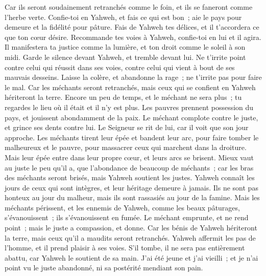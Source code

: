 \begin{multicols}{2}
Car ils seront soudainement retranchés comme le foin, et ils se faneront comme l'herbe verte.
 Confie-toi en Yahweh, et fais ce qui est bon~; aie le pays pour demeure et la fidélité pour pâture.
Fais de Yahweh tes délices, et il t'accordera ce que ton cœur désire.
 Recommande tes voies à Yahweh, confie-toi en lui et il agira.
Il manifestera ta justice comme la lumière, et ton droit comme le soleil à son midi.
 Garde le silence devant Yahweh, et tremble devant lui. Ne t'irrite point contre celui qui réussit dans ses voies, contre celui qui vient à bout de ses mauvais desseins.
 Laisse la colère, et abandonne la rage~; ne t'irrite pas pour faire le mal.
Car les méchants seront retranchés, mais ceux qui se confient en Yahweh hériteront la terre.
 Encore un peu de temps, et le méchant ne sera plus~; tu regardes le lieu où il était et il n'y est plus.
Les pauvres prennent possession du pays, et jouissent abondamment de la paix.
 Le méchant complote contre le juste, et grince ses dents contre lui.
Le Seigneur se rit de lui, car il voit que son jour approche.
 Les méchants tirent leur épée et bandent leur arc, pour faire tomber le malheureux et le pauvre, pour massacrer ceux qui marchent dans la droiture.
Mais leur épée entre dans leur propre cœur, et leurs arcs se brisent.
 Mieux vaut au juste le peu qu'il a, que l'abondance de beaucoup de méchants~;
car les bras des méchants seront brisés, mais Yahweh soutient les justes.
 Yahweh connaît les jours de ceux qui sont intègres, et leur héritage demeure à jamais.
Ils ne sont pas honteux au jour du malheur, mais ils sont rassasiés au jour de la famine.
 Mais les méchants périssent, et les ennemis de Yahweh, comme les beaux pâturages, s'évanouissent~; ils s'évanouissent en fumée.
 Le méchant emprunte, et ne rend point~; mais le juste a compassion, et donne.
Car les bénis de Yahweh hériteront la terre, mais ceux qu'il a maudits seront retranchés.
 Yahweh affermit les pas de l'homme, et il prend plaisir à ses voies.
S'il tombe, il ne sera pas entièrement abattu, car Yahweh le soutient de sa main.
 J'ai été jeune et j'ai vieilli~; et je n'ai point vu le juste abandonné, ni sa postérité mendiant son pain.

\end{multicols}
